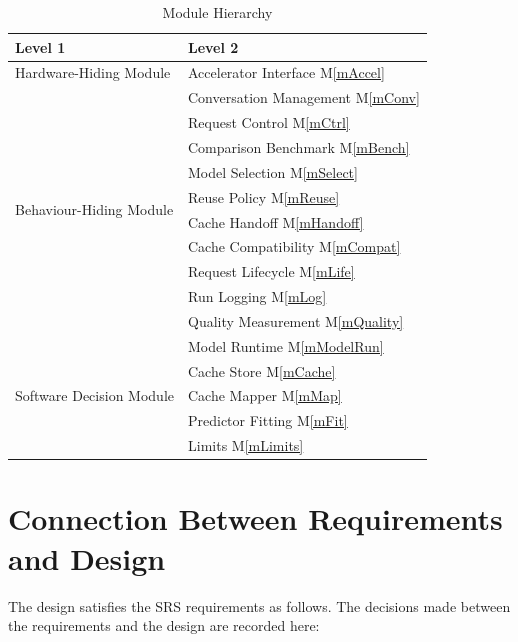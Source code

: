 \documentclass[12pt, titlepage]{article}
\newcommand{\mref}[1]{M\ref{#1}}
\begin{document}
\begin{table}[h!]
\centering
\begin{tabular}{p{} p{}}
\toprule
\textbf{Level 1} & \textbf{Level 2}\\
\midrule

{Hardware-Hiding Module} & Accelerator Interface \mref{mAccel}\\
\midrule

\multirow{10}{0.3\textwidth}{Behaviour-Hiding Module} & Conversation Management \mref{mConv}\\
& Request Control \mref{mCtrl}\\
& Comparison Benchmark \mref{mBench}\\
& Model Selection \mref{mSelect}\\
& Reuse Policy \mref{mReuse}\\
& Cache Handoff \mref{mHandoff}\\
& Cache Compatibility \mref{mCompat}\\
& Request Lifecycle \mref{mLife}\\
& Run Logging \mref{mLog}\\
& Quality Measurement \mref{mQuality}\\
\midrule

\multirow{5}{0.3\textwidth}{Software Decision Module} & Model Runtime \mref{mModelRun}\\
& Cache Store \mref{mCache}\\
& Cache Mapper \mref{mMap}\\
& Predictor Fitting \mref{mFit}\\
& Limits \mref{mLimits}\\
\bottomrule

\end{tabular}
\caption{Module Hierarchy}
\label{TblMH}
\end{table}

\section{Connection Between Requirements and Design} \label{SecConnection}

The design satisfies the SRS requirements as follows. The decisions made
between the requirements and the design are recorded here:
\end{document}

